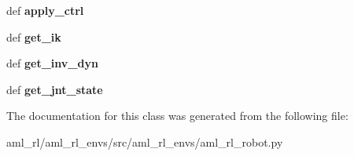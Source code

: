 \begin{DoxyCompactItemize}
\item 
\hypertarget{classaml__rl__envs_1_1aml__rl__robot_1_1_a_m_l_rl_robot_acbbc779205e5c34e4ba2a039e3da7956}{def {\bfseries apply\-\_\-ctrl}}\label{classaml__rl__envs_1_1aml__rl__robot_1_1_a_m_l_rl_robot_acbbc779205e5c34e4ba2a039e3da7956}

\item 
\hypertarget{classaml__rl__envs_1_1aml__rl__robot_1_1_a_m_l_rl_robot_a5c42e1d1d830e7289ae0ca2fb88b74e0}{def {\bfseries get\-\_\-ik}}\label{classaml__rl__envs_1_1aml__rl__robot_1_1_a_m_l_rl_robot_a5c42e1d1d830e7289ae0ca2fb88b74e0}

\item 
\hypertarget{classaml__rl__envs_1_1aml__rl__robot_1_1_a_m_l_rl_robot_aa6b1f571c8357ef6989db4a3214e8925}{def {\bfseries get\-\_\-inv\-\_\-dyn}}\label{classaml__rl__envs_1_1aml__rl__robot_1_1_a_m_l_rl_robot_aa6b1f571c8357ef6989db4a3214e8925}

\item 
\hypertarget{classaml__rl__envs_1_1aml__rl__robot_1_1_a_m_l_rl_robot_a7390d3037dbd86644d087ef330dcfd97}{def {\bfseries get\-\_\-jnt\-\_\-state}}\label{classaml__rl__envs_1_1aml__rl__robot_1_1_a_m_l_rl_robot_a7390d3037dbd86644d087ef330dcfd97}

\end{DoxyCompactItemize}


The documentation for this class was generated from the following file\-:\begin{DoxyCompactItemize}
\item 
aml\-\_\-rl/aml\-\_\-rl\-\_\-envs/src/aml\-\_\-rl\-\_\-envs/aml\-\_\-rl\-\_\-robot.\-py\end{DoxyCompactItemize}
